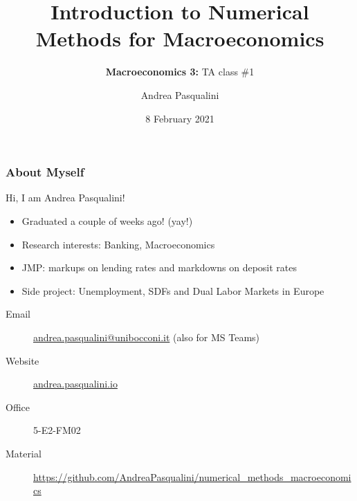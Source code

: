 \documentclass[10pt, aspectratio=1610]{beamer}
\title[Intro to Numerical Methods for Macro]{
  \textbf{Introduction to Numerical Methods for Macroeconomics}
}
\subtitle[Macro 3: TA\#1]{
  \textbf{Macroeconomics 3:} TA class \#1
}
\author[A.~Pasqualini]{
  Andrea Pasqualini
}
\institute[Bocconi]{Bocconi University}
\date{
  8 February 2021
}
\newcommand{\email}[1]{\href{mailto:#1}{#1}}
\newcommand{\website}[1]{\href{https://#1}{#1}}
\begin{document}
  \begin{frame}
    \maketitle
  \end{frame}

  \begin{frame}
    \frametitle{About Myself}

    Hi, I am Andrea Pasqualini!

    \vfill\pause

    \begin{itemize}
      \item Graduated a couple of weeks ago! (yay!)
      \item Research interests: Banking, Macroeconomics
      \item JMP: markups on lending rates and markdowns on deposit rates
      \item Side project: Unemployment, SDFs and Dual Labor Markets in Europe
    \end{itemize}

    \vfill\pause

    \begin{description}
      \item[Email] \email{andrea.pasqualini@unibocconi.it} (also for MS Teams)
      \item[Website] \website{andrea.pasqualini.io}
      \item[Office] 5-E2-FM02
      \item[Material] \href{https://github.com/AndreaPasqualini/numerical_methods_macroeconomics}{https://github.com/AndreaPasqualini/numerical\_methods\_macroeconomics}
    \end{description}

  \end{frame}
\end{document}
